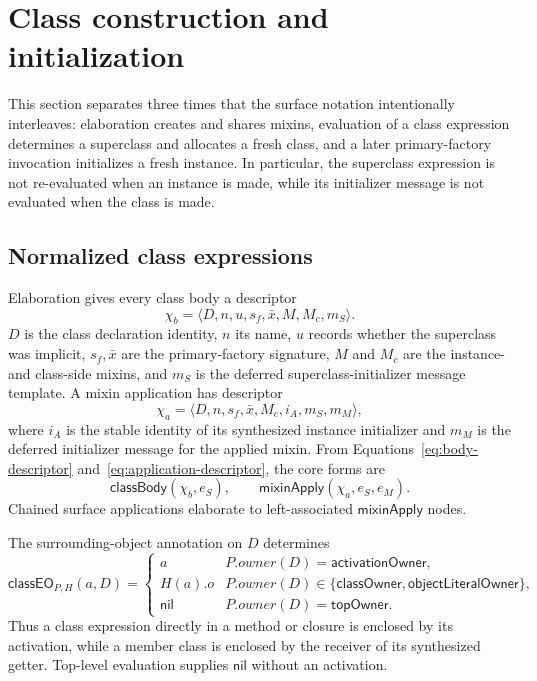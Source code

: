 \documentclass[11pt]{article}
\numberwithin{equation}{section}
\newcommand{\kw}[1]{\ensuremath{\mathsf{#1}}}
\newcommand{\nil}{\kw{nil}}
\begin{document}
\section{Class construction and initialization}
\label{sec:classes}

This section separates three times that the surface notation intentionally
interleaves: elaboration creates and shares mixins, evaluation of a class
expression determines a superclass and allocates a fresh class, and a later
primary-factory invocation initializes a fresh instance.  In particular, the
superclass expression is not re-evaluated when an instance is made, while its
initializer message is not evaluated when the class is made.

\subsection{Normalized class expressions}

Elaboration gives every class body a descriptor
\begin{equation}\label{eq:body-descriptor}
 \chi_b=\langle D,n,u,s_f,\bar x,M,M_c,m_S\rangle.
\end{equation}
$D$ is the class declaration identity, $n$ its name, $u$ records whether the
superclass was implicit, $s_f,\bar x$ are the primary-factory signature, $M$
and $M_c$ are the instance- and class-side mixins, and $m_S$ is the deferred
superclass-initializer message template.  A mixin application has descriptor
\begin{equation}\label{eq:application-descriptor}
 \chi_a=\langle D,n,s_f,\bar x,M_c,i_A,m_S,m_M\rangle,
\end{equation}
where $i_A$ is the stable identity of its synthesized instance initializer and
$m_M$ is the deferred initializer message for the applied mixin.  From
Equations~\eqref{eq:body-descriptor} and~\eqref{eq:application-descriptor}, the
core forms are
\begin{equation}\label{eq:class-forms}
 \kw{classBody}(\chi_b,e_S),
 \qquad
 \kw{mixinApply}(\chi_a,e_S,e_M).
\end{equation}
Chained surface applications elaborate to left-associated
$\kw{mixinApply}$ nodes.

The surrounding-object annotation on $D$ determines
\begin{equation}\label{eq:class-enclosing-object}
 \mathsf{classEO}_{P,H}(a,D)=
 \begin{cases}
  a & P.\mathit{owner}(D)=\kw{activationOwner},\\
  H(a).o & P.\mathit{owner}(D)\in
      \{\kw{classOwner},\kw{objectLiteralOwner}\},\\
  \nil & P.\mathit{owner}(D)=\kw{topOwner}.
 \end{cases}
\end{equation}
Thus a class expression directly in a method or closure is enclosed by its
activation, while a member class is enclosed by the receiver of its synthesized
getter.  Top-level evaluation supplies $\nil$ without an activation.
\end{document}
